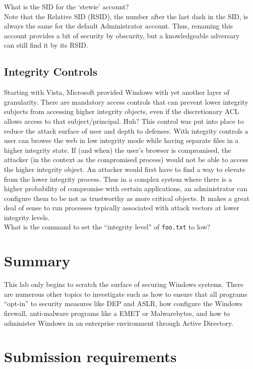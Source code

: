 \documentclass{article}
\begin{document}
\question What is the SID for the `stewie' account?\\

Note that the Relative SID (RSID), the number after the last dash in the SID, is always the same for the default Administrator account. Thus, renaming this account provides a bit of security by obscurity, but a knowledgeable adversary can still find it by its RSID.

\subsection{Integrity Controls}
Starting with Vista, Microsoft provided Windows with yet another layer of granularity.  There are mandatory access controls that can prevent lower integrity subjects from accessing higher integrity objects, even if the discretionary ACL allows access to that subject/principal.  Huh?  This control was put into place to reduce the attack surface of user and depth to defenses.  With integrity controls a user can browse the web in low integrity mode while having separate files in a higher integrity state.  If (and when) the user's browser is compromised, the attacker (in the context as the compromised process) would not be able to access the higher integrity object.  An attacker would first have to find a way to elevate from the lower integrity process.  Thus in a complex system where there is a higher probability of compromise with certain applications, an administrator can configure them to be not as trustworthy as more critical objects. It makes a great deal of sense to run processes typically associated with attack vectors at lower integrity levels. \\

\question What is the command to set the ``integrity level'' of {\tt foo.txt} to low? 


\section{Summary}
This lab only begins to scratch the surface of securing Windows systems.  There are numerous other topics to investigate such as how to ensure that all programs ``opt-in'' to security measures like DEP and ASLR, how configure the Windows firewall, anti-malware programs like a EMET or Malwarebytes, and how to administer Windows in an enterprise environment through Active Directory.  


\section{Submission requirements}
\end{document}
